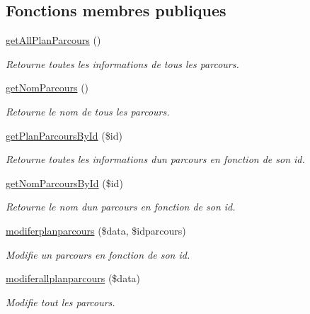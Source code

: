 \subsection*{Fonctions membres publiques}
\begin{DoxyCompactItemize}
\item 
\hyperlink{class_m___plan_parcours_a7224bcf89c4ef0aec9d62f58c4ab558e}{get\+All\+Plan\+Parcours} ()
\begin{DoxyCompactList}\small\item\em Retourne toutes les informations de tous les parcours. \end{DoxyCompactList}\item 
\hyperlink{class_m___plan_parcours_a7ebc02c441c37fef209de922c3125fc4}{get\+Nom\+Parcours} ()
\begin{DoxyCompactList}\small\item\em Retourne le nom de tous les parcours. \end{DoxyCompactList}\item 
\hyperlink{class_m___plan_parcours_a2698ceacf730b3f9d1684bbec1b29778}{get\+Plan\+Parcours\+By\+Id} (\$id)
\begin{DoxyCompactList}\small\item\em Retourne toutes les informations d\textquotesingle{}un parcours en fonction de son id. \end{DoxyCompactList}\item 
\hyperlink{class_m___plan_parcours_ad1d2afe3aa6cf2a7658f37de1277ed87}{get\+Nom\+Parcours\+By\+Id} (\$id)
\begin{DoxyCompactList}\small\item\em Retourne le nom d\textquotesingle{}un parcours en fonction de son id. \end{DoxyCompactList}\item 
\hyperlink{class_m___plan_parcours_ad967fad228d9e94396aecc45761416c6}{modiferplanparcours} (\$data, \$idparcours)
\begin{DoxyCompactList}\small\item\em Modifie un parcours en fonction de son id. \end{DoxyCompactList}\item 
\hyperlink{class_m___plan_parcours_a7c5ab11a644a7ab9971250e348630331}{modiferallplanparcours} (\$data)
\begin{DoxyCompactList}\small\item\em Modifie tout les parcours. \end{DoxyCompactList}\end{DoxyCompactItemize}


